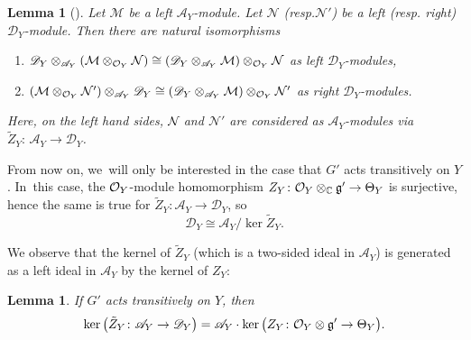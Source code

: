 \documentclass[11pt]{article}
\newcommand{\resp}{resp.\xspace}
\let\ra\rightarrow
\newtheorem{lem}[thm]{Lemma}
\newcommand{\cA}{\mathscr{A}}
\newcommand{\frg}{\mathfrak{g}}
\begin{document}
\begin{lem}[{\cite[Th.\,A.6 \& Cor.\,A.2]{CN05}}] \label{lem:tensorProductsOnAandD}
Let $\mathcal M$ be a left $\cA_Y$\nobreakdash-mod\-ule. Let $\mathcal N$ (\resp $\mathcal N'$) be a left (\resp right) $\mathscr{D}_Y$\nobreakdash-mod\-ule. Then there are natural isomorphisms
\begin{enumerate}
\item $\mathscr D_Y \otimes_{\cA_Y} (\mathcal M \otimes_{\O_Y} \mathcal N) \cong (\mathscr D_Y \otimes_{\cA_Y} \mathcal M) \otimes_{\O_Y} \mathcal N$ as left $\mathscr{D}_Y$\nobreakdash-mod\-ules, \label{item:leftCNMN}
\item $(\mathcal M \otimes_{\O_Y} \mathcal N') \otimes_{\cA_Y} \mathscr{D}_Y \cong (\mathscr{D}_Y \otimes_{\cA_Y} \mathcal M) \otimes_{\O_Y} \mathcal N'$ as right $\mathscr D_Y$\nobreakdash-mod\-ules. \label{item:rightCNMN}
\end{enumerate}
Here, on the left hand sides, $\mathcal N\mkern-3mu$ and $\mathcal N'$ are considered as $\cA_Y$\nobreakdash-mod\-ules via~\hbox{$\tilde Z_Y{:}\, \cA_Y\!\to\! \mathscr D_Y$}.
\end{lem}

From now on, we~will only be interested in the case that $G'$ acts transitively on $Y$. In~this case, the $\mathcal{O}_Y$\nobreakdash-mod\-ule homomorphism $Z_Y \colon \O_Y \otimes_\C \frg' \to \Theta_Y$ is surjective, hence the same is true for $\tilde{Z}_Y \colon \cA_Y \to \mathscr D_Y$, so
\[
\mathscr{D}_Y \cong \cA_Y/\ker \tilde Z_Y.
\]

We observe that the kernel of $\tilde Z_Y$ (which is a two-sided ideal in $\cA_Y$) is generated as a left ideal in $\cA_Y$ by the kernel of $Z_Y$:

\begin{lem}
\label{lem:kernelGeneratedByVFs}
If $G'$ acts transitively on $Y$, then
\[
\ker\big(\tilde{Z}_Y \colon \cA_Y \ra \mathscr{D}_Y\big) = \cA_Y \cdot \ker\big(Z_Y \colon \O_Y \otimes \frg' \ra \Theta_Y\big).
\]
\end{lem}
\end{document}
